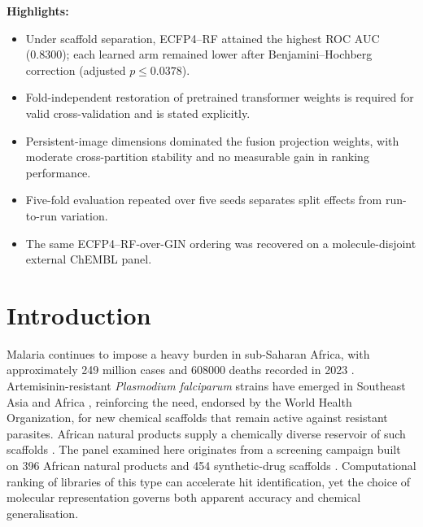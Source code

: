 \documentclass[11pt,a4paper]{article}
\begin{document}
\noindent\textbf{Highlights:}
\begin{itemize}
\item Under scaffold separation, ECFP4--RF attained the highest ROC AUC (\num{0.8300}); each learned arm remained lower after Benjamini--Hochberg correction (adjusted $p \le \num{0.0378}$).
\item Fold-independent restoration of pretrained transformer weights is required for valid cross-validation and is stated explicitly.
\item Persistent-image dimensions dominated the fusion projection weights, with moderate cross-partition stability and no measurable gain in ranking performance.
\item Five-fold evaluation repeated over five seeds separates split effects from run-to-run variation.
\item The same ECFP4--RF-over-GIN ordering was recovered on a molecule-disjoint external ChEMBL panel.
\end{itemize}

\section{Introduction}

Malaria continues to impose a heavy burden in sub-Saharan Africa, with approximately \num{249} million cases and \num{608000} deaths recorded in \num{2023} \citep{who2024malariareport}. Artemisinin-resistant \emph{Plasmodium falciparum} strains have emerged in Southeast Asia and Africa \citep{ariyey2014,ashley2018}, reinforcing the need, endorsed by the World Health Organization, for new chemical scaffolds that remain active against resistant parasites. African natural products supply a chemically diverse reservoir of such scaffolds \citep{anpdb_2026,value_addition_african_np_2025}. The panel examined here originates from a screening campaign built on \num{396} African natural products and \num{454} synthetic-drug scaffolds \citep{temgoua2026antimalarial}. Computational ranking of libraries of this type can accelerate hit identification, yet the choice of molecular representation governs both apparent accuracy and chemical generalisation.
\end{document}
